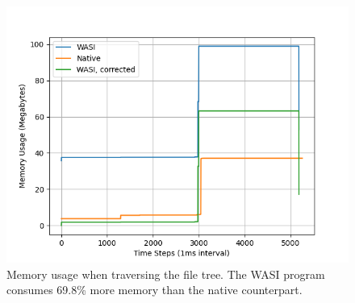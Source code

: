 \begin{figure}[H]
  \centering
  \includegraphics[width=1\textwidth]{images/mass_storage_memory_filetree_with_correction.png}
  \caption{Memory usage when traversing the file tree. The \acrshort{WASI} program consumes 69.8\% more memory than the native counterpart.}
  \label{fig:mass_storage_file_tree_comparison}
\end{figure}